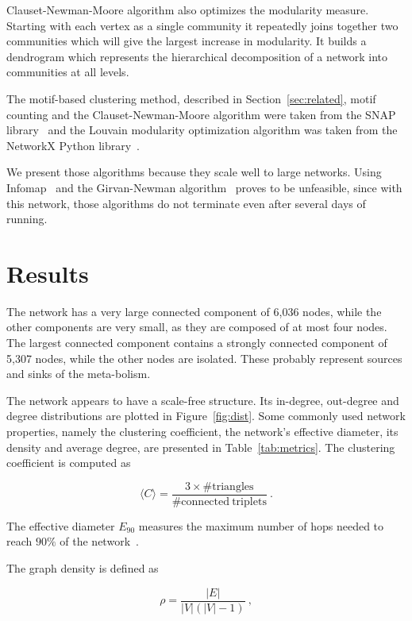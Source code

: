 Clauset-Newman-Moore algorithm also optimizes the modularity measure. Starting
with each vertex as a single community it repeatedly joins together two
communities which will give the largest increase in modularity. It builds a
dendrogram which represents the hierarchical decomposition of a network into
communities at all levels.

The motif-based clustering method, described in Section~\ref{sec:related}, motif
counting and the Clauset-Newman-Moore algorithm were taken from the SNAP
library~\cite{leskovec2016snap} and the Louvain modularity optimization
algorithm was taken from the NetworkX Python library~\cite{networkx}.

We present those algorithms because they scale well to large networks.  Using
Infomap~\cite{rosvall2008maps} and the Girvan-Newman
algorithm~\cite{girvan2002community} proves to be unfeasible, since with this
network, those algorithms do not terminate even after several days of running.

\section{Results}
\label{sec:results}

The network has a very large connected component of 6,036 nodes, while the other
components are very small, as they are composed of at most four nodes. The
largest connected component contains a strongly connected component of 5,307
nodes, while the other nodes are isolated. These probably represent sources and
sinks of the meta-bolism.

The network appears to have a scale-free structure. Its in-degree, out-degree
and degree distributions are plotted in Figure~\ref{fig:dist}. Some commonly
used network properties, namely the clustering coefficient, the network's
effective diameter, its density and average degree, are presented in
Table~\ref{tab:metrics}. The clustering coefficient is computed as

\begin{equation}
  \langle C \rangle = \frac{3 \times \mathrm{\# triangles}}{\mathrm{\# connected
  \ triplets}}\ .
\end{equation}

The effective diameter $E_{90}$ measures the maximum number of hops needed to
reach $90\%$ of the network~\cite{leskovec2007graph}.

The graph density is defined as

\begin{equation}
  \rho = \frac{|E|}{|V|(|V| - 1)}\ ,
\end{equation}

